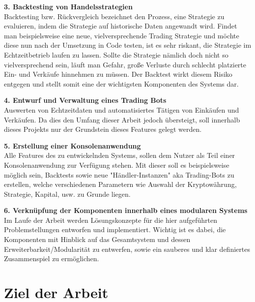 \documentclass[oneside]{ausarbeitung}
\begin{document}
\textbf{3. Backtesting von Handelsstrategien} \\
Backtesting bzw. Rückvergleich bezeichnet den Prozess, eine Strategie
zu evaluieren, indem die Strategie auf historische Daten angewandt
wird\cite{backtesting_definition}. Findet man beispielsweise eine neue,
vielversprechende Trading
Strategie und möchte diese nun nach der Umsetzung in Code testen, ist
es sehr riskant, die Strategie im Echtzeitbetrieb laufen zu lassen.
Sollte die Strategie nämlich doch nicht so vielversprechend sein,
läuft man Gefahr, große Verluste durch schlecht platzierte Ein- und
Verkäufe hinnehmen zu müssen. Der Backtest wirkt diesem Risiko
entgegen und stellt somit eine der wichtigsten Komponenten des Systems
dar.

\textbf{4. Entwurf und Verwaltung eines Trading Bots} \\
Auswerten von Echtzeitdaten und automatisiertes Tätigen von
Einkäufen und Verkäufen. Da dies den Umfang dieser Arbeit jedoch
übersteigt, soll innerhalb dieses Projekts nur der Grundstein dieses
Features gelegt werden.

\textbf{5. Erstellung einer Konsolenanwendung} \\
Alle Features des zu entwickelnden Systems, sollen dem Nutzer als Teil
einer Konsolenanwendung zur Verfügung stehen. Mit dieser soll es
beispielsweise möglich sein, Backtests sowie neue
"Händler-Instanzen" aka Trading-Bots zu erstellen, welche
verschiedenen Parametern wie Auswahl der Kryptowährung, Strategie,
Kapital, usw. zu Grunde liegen.

\textbf{6. Verknüpfung der Komponenten innerhalb eines modularen Systems} \\
Im Laufe der Arbeit werden Lösungskonzepte für die hier
aufgeführten Problemstellungen entworfen und implementiert. Wichtig
ist es dabei, die Komponenten mit Hinblick auf das Gesamtsystem und
dessen Erweiterbarkeit/Modularität zu entwerfen, sowie ein sauberes
und klar definiertes Zusammenspiel zu ermöglichen. 

\section{Ziel der Arbeit}
\label{sec:ziel}
\end{document}
